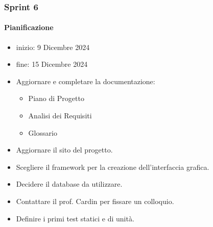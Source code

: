 \documentclass{article}
\begin{document}
            \subsubsection{Sprint 6}
                \paragraph{Pianificazione}
                \begin{itemize}
                    \item inizio: 9 Dicembre 2024
                    \item fine: 15 Dicembre 2024
                \end{itemize}
                \begin{itemize}
                    \item Aggiornare e completare la documentazione:
                    \begin{itemize}
                        \item Piano di Progetto
                        \item Analisi dei Requisiti
                        \item Glossario
                    \end{itemize}
                    \item Aggiornare il sito del progetto.
                    \item Scegliere il framework per la creazione dell'interfaccia grafica.
                    \item Decidere il database da utilizzare.
                    \item Contattare il prof. Cardin per fissare un colloquio.
                    \item Definire i primi test statici e di unità.
                \end{itemize}

\end{document}
